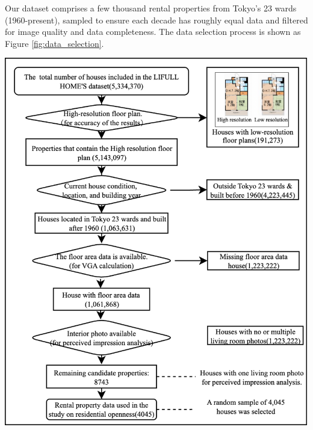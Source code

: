 \documentclass[11pt,a4paper]{article}
\begin{document}
\begin{multicols}{2}
Our dataset comprises a few thousand rental properties from Tokyo's 23 wards (1960-present), 
sampled to ensure each decade has roughly equal data and filtered for image quality and data completeness. The data selection process is
shown as Figure \ref{fig:data_selection}.
\begin{center}
    \includegraphics[width=0.95\columnwidth]{plots/data_filtering.png}
    \label{fig:data_selection}
\end{center}




\end{multicols}
\end{document}
